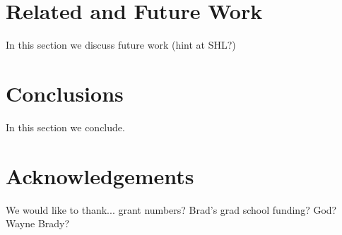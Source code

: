 \documentclass[letterpaper]{article}
\begin{document}
\section{Related and Future Work}
\label{sec:future}
In this section we discuss future work (hint at SHL?)

\section{Conclusions}
\label{sec:conclusions}
In this section we conclude.

\section{Acknowledgements}
\label{sec:acknowledgements}
We would like to thank... grant numbers?  Brad's grad school funding?  God?
Wayne Brady?



\end{document}
